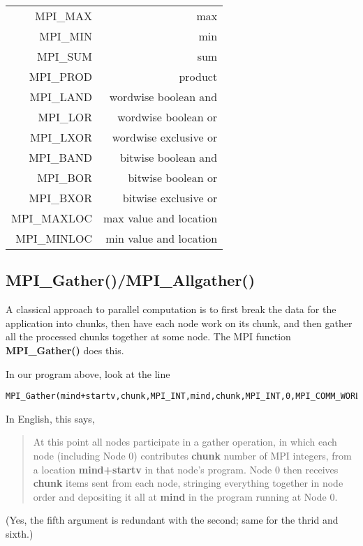 \begin{tabular}{|r|r|}
\hline
MPI\_MAX & max \\
MPI\_MIN & min \\
MPI\_SUM & sum \\
MPI\_PROD & product \\
MPI\_LAND & wordwise boolean and \\
MPI\_LOR & wordwise boolean or \\
MPI\_LXOR & wordwise exclusive or \\
MPI\_BAND & bitwise boolean and \\
MPI\_BOR & bitwise boolean or \\
MPI\_BXOR & bitwise exclusive or \\
MPI\_MAXLOC & max value and location \\
MPI\_MINLOC & min value and location \\
\hline
\end{tabular}

\subsection{MPI\_Gather()/MPI\_Allgather()}

A classical approach to parallel computation is to first break the data for
the application into chunks, then have each node work on its chunk, and
then gather all the processed chunks together at some node.  The MPI
function {\bf MPI\_Gather()} does this.

In our program above, look at the line

\begin{Verbatim}[fontsize=\relsize{-2}]
MPI_Gather(mind+startv,chunk,MPI_INT,mind,chunk,MPI_INT,0,MPI_COMM_WORLD);
\end{Verbatim}

In English, this says,

\begin{quote}

At this point all nodes participate in a gather operation, in which each
node (including Node 0) contributes {\bf chunk} number of MPI integers,
from a location {\bf mind+startv} in that node's program.  Node 0 then
receives {\bf chunk} items sent from each node, stringing everything together
in node order and depositing it all at {\bf mind} in the program running
at Node 0.

\end{quote}

(Yes, the fifth argument is redundant with the second; same for the
thrid and sixth.)

